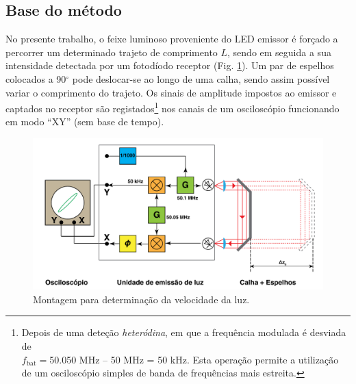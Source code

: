 \documentclass[a4paper,twoside,11pt]{report}      %
\begin{document}

\newpage
\subsection{\sf Base do método}
No presente trabalho, o feixe luminoso proveniente do LED emissor é forçado a percorrer um determinado trajeto de comprimento $L$, sendo em seguida a sua intensidade  detectada por um fotodíodo receptor (Fig. \ref{fig:Montagem}). Um par de espelhos colocados a 90$^\circ$ pode deslocar-se ao longo de uma calha, sendo assim possível variar o comprimento do trajeto. Os sinais de amplitude impostos ao emissor e captados no receptor são registados\footnote{Depois de uma deteção \emph{heteródina}, em que a frequência modulada é desviada de \\ 
$f_{\textrm{bat}}=$50.050 MHz -- 50 MHz  = 50 kHz. Esta operação permite a utilização de um osciloscópio simples de banda de frequências mais estreita.} 
nos canais de um osciloscópio funcionando em modo “XY” (sem base de tempo).

\begin{figure}[htb] 
 \centering 
	\includegraphics[width=01.0\textwidth]{esquema}
	\caption{Montagem para determinação da velocidade da luz. \label{fig:Montagem}} 
\end{figure}
\end{document}
